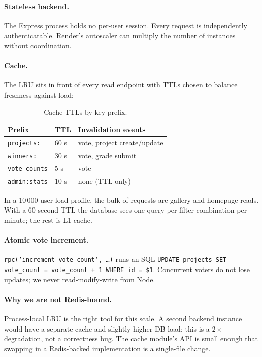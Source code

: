 \paragraph{Stateless backend.} The Express process holds no per-user
session. Every request is independently authenticatable. Render's
autoscaler can multiply the number of instances without coordination.

\paragraph{Cache.} The LRU sits in front of every read endpoint with TTLs
chosen to balance freshness against load:

\begin{table}[ht]
  \centering
  \caption{Cache TTLs by key prefix.}
  \begin{tabular}{lll}
    \toprule
    Prefix & TTL & Invalidation events \\
    \midrule
    \texttt{projects:} & 60 s & vote, project create/update \\
    \texttt{winners:}  & 30 s & vote, grade submit \\
    \texttt{vote-counts} & 5 s & vote \\
    \texttt{admin:stats} & 10 s & none (TTL only) \\
    \bottomrule
  \end{tabular}
\end{table}

In a 10\,000-user load profile, the bulk of requests are gallery and
homepage reads. With a 60-second TTL the database sees one query per
filter combination per minute; the rest is L1 cache.

\paragraph{Atomic vote increment.} \texttt{rpc('increment\_vote\_count', \dots)}
runs an SQL \texttt{UPDATE projects SET vote\_count = vote\_count + 1
WHERE id = \$1}. Concurrent voters do not lose updates; we never
read-modify-write from Node.

\paragraph{Why we are not Redis-bound.} Process-local LRU is the right
tool for this scale. A second backend instance would have a separate
cache and slightly higher DB load; this is a $2\times$ degradation, not
a correctness bug. The cache module's API is small enough that swapping
in a Redis-backed implementation is a single-file change.

